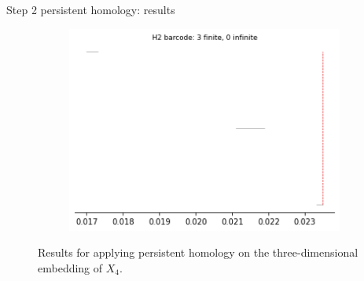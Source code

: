 \documentclass[xcolor={dvipsnames,svgnames}]{beamer}
\begin{document}
\begin{frame}{Step 2 persistent homology: results}
\begin{figure}[H]
\begin{subfigure}[b]{0.2\textwidth}
\includegraphics[width=\textwidth]{figures/X4_H2_barcode.png}
 \caption{}
\end{subfigure}
\caption{\scriptsize Results for applying persistent homology on the three-dimensional embedding of $X_4$.}
\end{figure}
\end{frame}
\end{document}
